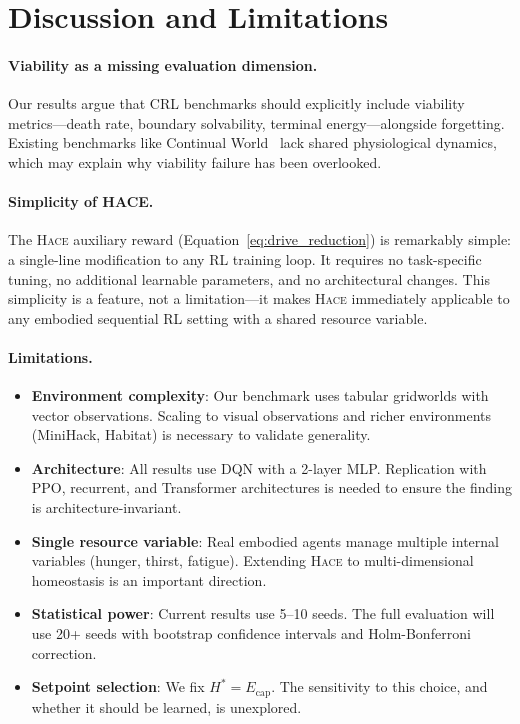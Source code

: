 \documentclass{article}
\newcommand{\setpoint}{H^*}
\newcommand{\energy}{E}
\newcommand{\hace}{\textsc{Hace}}
\begin{document}
\section{Discussion and Limitations}
\label{sec:discussion}

\paragraph{Viability as a missing evaluation dimension.}
Our results argue that CRL benchmarks should explicitly include viability
metrics—death rate, boundary solvability, terminal energy—alongside
forgetting. Existing benchmarks like Continual World~\cite{continualworld2021}
lack shared physiological dynamics, which may explain why viability failure
has been overlooked.

\paragraph{Simplicity of HACE.}
The \hace{} auxiliary reward (Equation~\ref{eq:drive_reduction}) is
remarkably simple: a single-line modification to any RL training loop.
It requires no task-specific tuning, no additional learnable parameters,
and no architectural changes. This simplicity is a feature, not a
limitation—it makes \hace{} immediately applicable to any embodied
sequential RL setting with a shared resource variable.

\paragraph{Limitations.}

\begin{itemize}[leftmargin=*,topsep=1pt,itemsep=1pt]
  \item \textbf{Environment complexity}: Our benchmark uses tabular
        gridworlds with vector observations. Scaling to visual observations
        and richer environments (MiniHack, Habitat) is necessary to
        validate generality.
  \item \textbf{Architecture}: All results use DQN with a 2-layer MLP.
        Replication with PPO, recurrent, and Transformer architectures
        is needed to ensure the finding is architecture-invariant.
  \item \textbf{Single resource variable}: Real embodied agents manage
        multiple internal variables (hunger, thirst, fatigue). Extending
        \hace{} to multi-dimensional homeostasis is an important
        direction.
  \item \textbf{Statistical power}: Current results use 5--10 seeds.
        The full evaluation will use 20+ seeds with bootstrap confidence
        intervals and Holm-Bonferroni correction.
  \item \textbf{Setpoint selection}: We fix $\setpoint = \energy_{\text{cap}}$.
        The sensitivity to this choice, and whether it should be learned,
        is unexplored.
\end{itemize}
\end{document}
